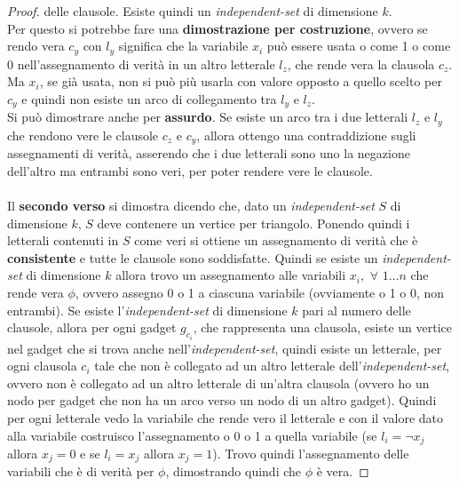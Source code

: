 \begin{esempio}
\begin{proof}
    delle clausole. Esiste quindi un \textit{independent-set} di dimensione
    $k$.\\
    Per questo si potrebbe fare una \textbf{dimostrazione per costruzione},
    ovvero se rendo vera $c_y$ con $l_y$ significa che la variabile $x_i$ può
    essere usata o come 1 o come 0 nell'assegnamento di verità in un altro
    letterale $l_z$, che rende vera la clausola $c_z$. Ma $x_i$, se già usata,
    non si può più usarla con valore opposto a quello scelto per $c_y$ e quindi
    non esiste un arco di collegamento tra $l_y$ e $l_z$.\\
    Si può dimostrare anche per \textbf{assurdo}. Se esiste un arco tra i due
    letterali $l_z$ e $l_y$ che rendono vere le clausole $c_z$ e $c_y$,
    allora ottengo una contraddizione sugli assegnamenti di verità, asserendo
    che i due letterali sono uno la negazione dell'altro ma entrambi sono
    veri, per poter rendere vere le clausole. 
    \\
    \\
    Il \textbf{secondo verso} si dimostra dicendo che, dato un
    \textit{independent-set} 
    $S$ di dimensione $k$, $S$ deve contenere un vertice per triangolo. Ponendo
    quindi i letterali contenuti in $S$ come veri si ottiene un assegnamento di
    verità che è \textbf{consistente} e tutte le clausole sono soddisfatte.
    Quindi se esiste un \textit{independent-set} di dimensione $k$ allora trovo
    un assegnamento alle variabili $x_i,\,\,\forall \,\,1\ldots n$ che rende
    vera $\phi$, ovvero assegno 0 o 1 a ciascuna variabile (ovviamente o 1 o 0,
    non entrambi). Se esiste l'\textit{independent-set} di dimensione $k$ pari
    al numero delle clausole, allora per ogni gadget $g_{c_i}$,
    che rappresenta una clausola, esiste un vertice nel gadget che si trova
    anche nell'\textit{independent-set}, quindi esiste un letterale, per ogni
    clausola $c_i$ tale che non è collegato ad un altro letterale
    dell'\textit{independent-set}, ovvero non è collegato ad un altro letterale
    di un'altra clausola (ovvero ho un nodo per gadget che non ha un arco verso
    un nodo di un altro gadget). Quindi per ogni letterale vedo la variabile che
    rende vero il letterale e con il valore dato alla variabile costruisco
    l'assegnamento o 0 o 1 a quella variabile (se $l_i=\neg x_j$ allora
    $x_j=0$ e se $l_i= x_j$ allora $x_j=1$). Trovo quindi l'assegnamento delle
    variabili che è di verità per $\phi$, dimostrando quindi che $\phi$ è vera.
  \end{proof}
\end{esempio}
